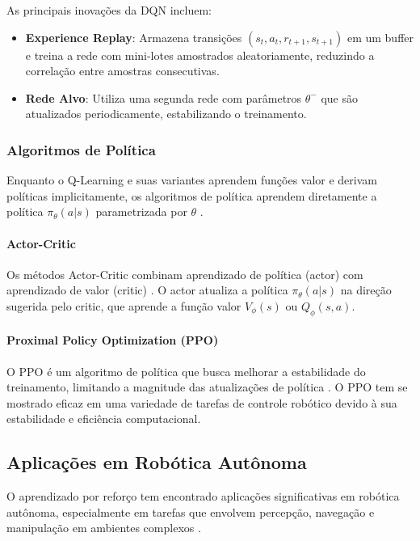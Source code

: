 As principais inovações da DQN incluem:

\begin{itemize}
    \item \textbf{Experience Replay}: Armazena transições $(s_t, a_t, r_{t+1}, s_{t+1})$ em um buffer e treina a rede com mini-lotes amostrados aleatoriamente, reduzindo a correlação entre amostras consecutivas.
    \item \textbf{Rede Alvo}: Utiliza uma segunda rede com parâmetros $\theta^-$ que são atualizados periodicamente, estabilizando o treinamento.
\end{itemize}

\subsubsection{Algoritmos de Política}

Enquanto o Q-Learning e suas variantes aprendem funções valor e derivam políticas implicitamente, os algoritmos de política aprendem diretamente a política $\pi_{\theta}(a|s)$ parametrizada por $\theta$ \cite{Sutton1999}.

\paragraph{Actor-Critic}

Os métodos Actor-Critic combinam aprendizado de política (actor) com aprendizado de valor (critic) \cite{Konda1999}. O actor atualiza a política $\pi_{\theta}(a|s)$ na direção sugerida pelo critic, que aprende a função valor $V_{\phi}(s)$ ou $Q_{\phi}(s, a)$.

\paragraph{Proximal Policy Optimization (PPO)}

O PPO é um algoritmo de política que busca melhorar a estabilidade do treinamento, limitando a magnitude das atualizações de política \cite{Schulman2017}. O PPO tem se mostrado eficaz em uma variedade de tarefas de controle robótico devido à sua estabilidade e eficiência computacional.

\subsection{Aplicações em Robótica Autônoma}

O aprendizado por reforço tem encontrado aplicações significativas em robótica autônoma, especialmente em tarefas que envolvem percepção, navegação e manipulação em ambientes complexos \cite{Kober2013}.

